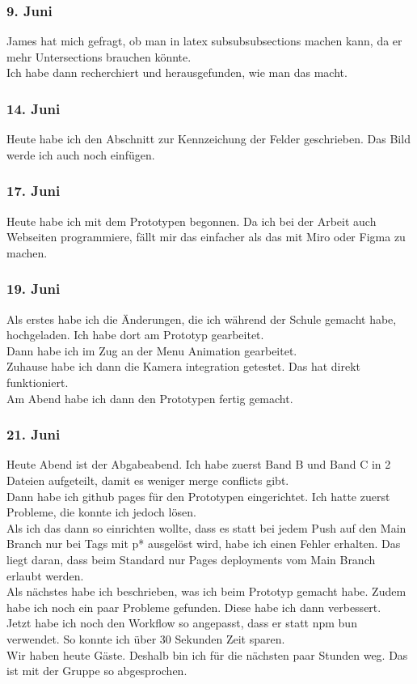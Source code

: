 \documentclass[10pt]{article}
\newcounter{subsubsubsection}[subsubsection]
\begin{document}
	\subsubsection{9. Juni}
	James hat mich gefragt, ob man in latex subsubsubsections machen kann, da er mehr Untersections brauchen könnte.\\
	Ich habe dann recherchiert und herausgefunden, wie man das macht.
	\subsubsection{14. Juni}
	Heute habe ich den Abschnitt zur Kennzeichung der Felder geschrieben. Das Bild werde ich auch noch einfügen.\\
	\subsubsection{17. Juni}
	Heute habe ich mit dem Prototypen begonnen. Da ich bei der Arbeit auch Webseiten programmiere, fällt mir das einfacher als das mit Miro oder Figma zu machen.
	\subsubsection{19. Juni}
	Als erstes habe ich die Änderungen, die ich während der Schule gemacht habe, hochgeladen. Ich habe dort am Prototyp gearbeitet.\\
	Dann habe ich im Zug an der Menu Animation gearbeitet.\\
	Zuhause habe ich dann die Kamera integration getestet. Das hat direkt funktioniert.\\
	Am Abend habe ich dann den Prototypen fertig gemacht.
	\subsubsection{21. Juni}
	Heute Abend ist der Abgabeabend. Ich habe zuerst Band B und Band C in 2 Dateien aufgeteilt, damit es weniger merge conflicts gibt.\\
	Dann habe ich github pages für den Prototypen eingerichtet. Ich hatte zuerst Probleme, die konnte ich jedoch lösen.\\
	Als ich das dann so einrichten wollte, dass es statt bei jedem Push auf den Main Branch nur bei Tags mit p* ausgelöst wird, habe ich einen Fehler erhalten. Das liegt daran, dass beim Standard nur Pages deployments vom Main Branch erlaubt werden.\\
	Als nächstes habe ich beschrieben, was ich beim Prototyp gemacht habe. Zudem habe ich noch ein paar Probleme gefunden. Diese habe ich dann verbessert.\\
	Jetzt habe ich noch den Workflow so angepasst, dass er statt npm bun verwendet. So konnte ich über 30 Sekunden Zeit sparen.\\
	Wir haben heute Gäste. Deshalb bin ich für die nächsten paar Stunden weg. Das ist mit der Gruppe so abgesprochen.
	
\end{document}
